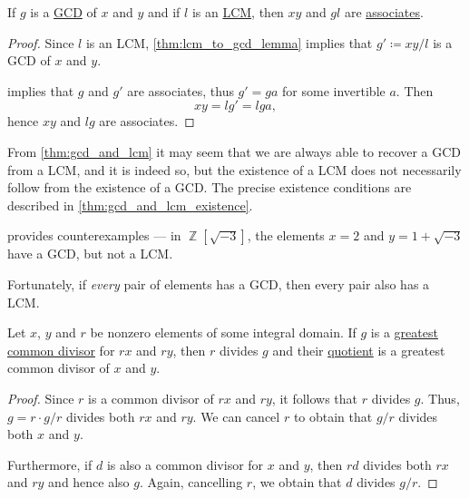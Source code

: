 \begin{proposition}\label{thm:gcd_and_lcm}
  If \( g \) is a \hyperref[def:gcd]{GCD} of \( x \) and \( y \) and if \( l \) is an \hyperref[def:lcm]{LCM}, then \( xy \) and \( gl \) are \hyperref[def:domain_divisibility/associates]{associates}.
\end{proposition}
\begin{proof}
  Since \( l \) is an LCM, \cref{thm:lcm_to_gcd_lemma} implies that \( g' \coloneqq xy / l \) is a GCD of \( x \) and \( y \).

   implies that \( g \) and \( g' \) are associates, thus \( g' = ga \) for some invertible \( a \). Then
  \begin{equation*}
    xy = lg' = lga,
  \end{equation*}
  hence \( xy \) and \( lg \) are associates.
\end{proof}

\begin{remark}\label{rem:gcd_but_no_lcm}
  From \cref{thm:gcd_and_lcm} it may seem that we are always able to recover a GCD from a LCM, and it is indeed so, but the existence of a LCM does not necessarily follow from the existence of a GCD. The precise existence conditions are described in \cref{thm:gcd_and_lcm_existence}.

  \textcite[thm. 4]{Khurana2003GCD} provides counterexamples --- in \( \BbbZ[\sqrt{-3}] \), the elements \( x = 2 \) and \( y = 1 + \sqrt{-3} \) have a GCD, but not a LCM.

  Fortunately, if \emph{every} pair of elements has a GCD, then every pair also has a LCM.
\end{remark}

\begin{lemma}\label{thm:gcd_of_multiple}
  Let \( x \), \( y \) and \( r \) be nonzero elements of some integral domain. If \( g \) is a \hyperref[def:gcd]{greatest common divisor} for \( rx \) and \( ry \), then \( r \) divides \( g \) and their \hyperref[def:domain_quotient]{quotient} is a greatest common divisor of \( x \) and \( y \).
\end{lemma}
\begin{proof}
  Since \( r \) is a common divisor of \( rx \) and \( ry \), it follows that \( r \) divides \( g \). Thus, \( g = r \cdot g / r \) divides both \( rx \) and \( ry \). We can cancel \( r \) to obtain that \( g / r \) divides both \( x \) and \( y \).

  Furthermore, if \( d \) is also a common divisor for \( x \) and \( y \), then \( rd \) divides both \( rx \) and \( ry \) and hence also \( g \). Again, cancelling \( r \), we obtain that \( d \) divides \( g / r \).
\end{proof}

